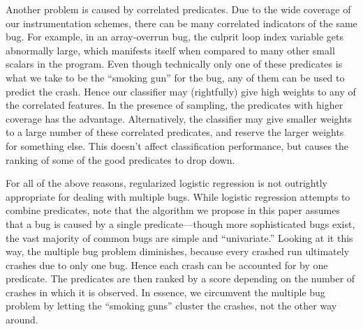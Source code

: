 Another problem is caused by correlated predicates.
Due to the wide coverage of our instrumentation schemes, there can be
many correlated indicators of the same bug.  For example, in an
array-overrun bug, the culprit loop index variable gets abnormally
large, which manifests itself when compared to many other small
scalars in the program.  Even though technically only one of these
predicates is what we take to be the ``smoking gun'' for the bug, any
of them can be used to predict the crash.  Hence our classifier may
(rightfully) give high weights to any of the correlated features.  In
the presence of sampling, the predicates with higher coverage has the
advantage.  Alternatively, the classifier may give smaller
weights to a large number of these correlated predicates, and reserve
the larger weights for something else.  This doesn't affect
classification performance, but causes the ranking of
some of the good predicates to drop down.

For all of the above reasons, regularized logistic regression is not
outrightly appropriate for dealing with multiple bugs.  While logistic
regression attempts to combine predicates, note that the algorithm we
propose in this paper assumes that a bug is caused by a single
predicate---though more sophisticated bugs exist, the vast majority of
common bugs are simple and ``univariate.''  Looking at it this way,
the multiple bug problem diminishes, because every crashed run
ultimately crashes due to only one bug.  Hence each crash can be
accounted for by one predicate.  The predicates are then ranked by a
score depending on the number of crashes in which it is observed.  In
essence, we circumvent the multiple bug problem by letting the
``smoking guns'' cluster the crashes, not the other way around.

